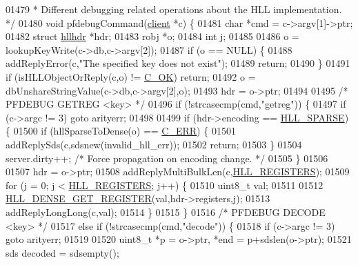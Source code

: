 \begin{DoxyCode}
{{{{01479 \textcolor{comment}{ * Different debugging related operations about the HLL implementation. */}
01480 \textcolor{keywordtype}{void} pfdebugCommand(\hyperlink{structclient}{client} *c) \{
01481     \textcolor{keywordtype}{char} *cmd = c->argv[1]->ptr;
01482     \textcolor{keyword}{struct} \hyperlink{structhllhdr}{hllhdr} *hdr;
01483     robj *o;
01484     \textcolor{keywordtype}{int} j;
01485 
01486     o = lookupKeyWrite(c->db,c->argv[2]);
01487     \textcolor{keywordflow}{if} (o == NULL) \{
01488         addReplyError(c,\textcolor{stringliteral}{"The specified key does not exist"});
01489         \textcolor{keywordflow}{return};
01490     \}
01491     \textcolor{keywordflow}{if} (isHLLObjectOrReply(c,o) != \hyperlink{server_8h_a303769ef1065076e68731584e758d3e1}{C\_OK}) \textcolor{keywordflow}{return};
01492     o = dbUnshareStringValue(c->db,c->argv[2],o);
01493     hdr = o->ptr;
01494 
01495     \textcolor{comment}{/* PFDEBUG GETREG <key> */}
01496     \textcolor{keywordflow}{if} (!strcasecmp(cmd,\textcolor{stringliteral}{"getreg"})) \{
01497         \textcolor{keywordflow}{if} (c->argc != 3) \textcolor{keywordflow}{goto} arityerr;
01498 
01499         \textcolor{keywordflow}{if} (hdr->encoding == \hyperlink{hyperloglog_8c_afe326d57dd3d7c27c8fe52dc2c19cecd}{HLL\_SPARSE}) \{
01500             \textcolor{keywordflow}{if} (hllSparseToDense(o) == \hyperlink{server_8h_af98ac28d5f4d23d7ed5985188e6fb7d1}{C\_ERR}) \{
01501                 addReplySds(c,sdsnew(invalid\_hll\_err));
01502                 \textcolor{keywordflow}{return};
01503             \}
01504             server.dirty++; \textcolor{comment}{/* Force propagation on encoding change. */}
01505         \}
01506 
01507         hdr = o->ptr;
01508         addReplyMultiBulkLen(c,\hyperlink{hyperloglog_8c_aa053beb90136828dcb46545c7445fc36}{HLL\_REGISTERS});
01509         \textcolor{keywordflow}{for} (j = 0; j < \hyperlink{hyperloglog_8c_aa053beb90136828dcb46545c7445fc36}{HLL\_REGISTERS}; j++) \{
01510             uint8\_t val;
01511 
01512             \hyperlink{hyperloglog_8c_abace3387aeb1543c9bcbd0d9a62c7ebc}{HLL\_DENSE\_GET\_REGISTER}(val,hdr->registers,j);
01513             addReplyLongLong(c,val);
01514         \}
01515     \}
01516     \textcolor{comment}{/* PFDEBUG DECODE <key> */}
01517     \textcolor{keywordflow}{else} \textcolor{keywordflow}{if} (!strcasecmp(cmd,\textcolor{stringliteral}{"decode"})) \{
01518         \textcolor{keywordflow}{if} (c->argc != 3) \textcolor{keywordflow}{goto} arityerr;
01519 
01520         uint8\_t *p = o->ptr, *end = p+sdslen(o->ptr);
01521         sds decoded = sdsempty();
}}}}
\end{DoxyCode}
